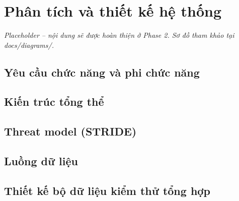\chapter{Phân tích và thiết kế hệ thống}
\label{ch:phan-tich-thiet-ke}

\textit{Placeholder -- nội dung sẽ được hoàn thiện ở Phase 2. Sơ đồ tham khảo tại docs/diagrams/.}

\section{Yêu cầu chức năng và phi chức năng}

\section{Kiến trúc tổng thể}

\section{Threat model (STRIDE)}

\section{Luồng dữ liệu}

\section{Thiết kế bộ dữ liệu kiểm thử tổng hợp}
